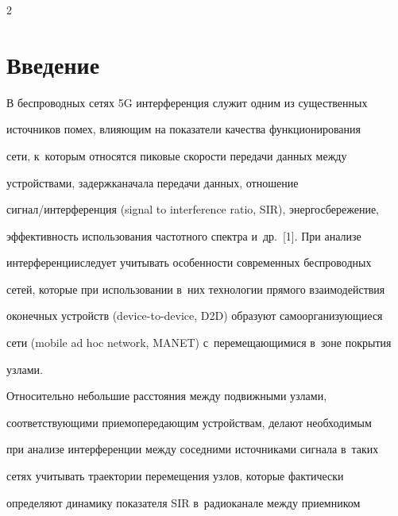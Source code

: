 


\thispagestyle{headings}



\begin{multicols}{2}



\label{st\stat}



\section{Введение}



  В беспроводных сетях 5G интерференция служит одним из существенных 

источников помех, вли\-я\-ющим на показатели качества функционирования 

сети, к~которым относятся пиковые ско\-рости передачи данных между 

устройствами, задержка\linebreak начала передачи данных, отношение 

сигнал/\-ин\-тер\-фе\-рен\-ция (signal to interference ratio, SIR), энер\-го\-сбе\-ре\-же\-ние, 

эффективность использования частот\-но\-го спектра и~др.~[1]. При анализе 

интерференции\linebreak следует учитывать особенности современных беспроводных 

сетей, которые при использовании в~них технологии прямого взаимодействия 

оконечных устройств (device-to-device, D2D) образуют самоорганизующиеся 

сети (mobile ad hoc network, MANET) с~перемещающимися в~зоне покрытия 

узлами.\linebreak

 Относительно небольшие расстояния между подвижными узлами, 

соответствующими при\-емо\-пе\-ре\-да\-ющим устройствам, делают необходимым 

при анализе интерференции между соседними источниками сигнала в~таких 

сетях учитывать траектории перемещения узлов, которые фактически 

определяют динамику показателя SIR в~радиоканале между приемником 


\end{multicols}
